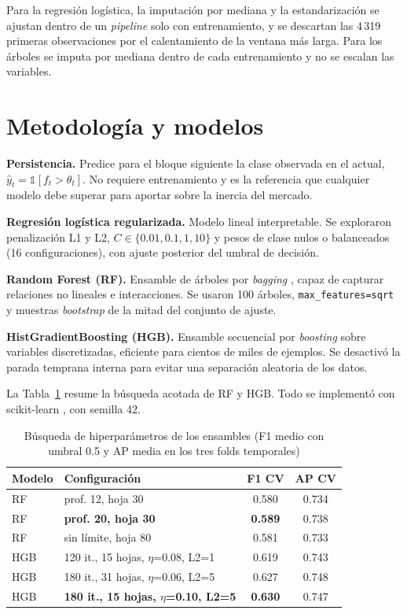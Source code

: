 \documentclass[conference]{IEEEtran}
\begin{document}
Para la regresión logística, la imputación por mediana y la estandarización se ajustan dentro de un \textit{pipeline} solo con entrenamiento, y se descartan las 4\,319 primeras observaciones por el calentamiento de la ventana más larga. Para los árboles se imputa por mediana dentro de cada entrenamiento y no se escalan las variables.

\section{Metodología y modelos}
\textbf{Persistencia.} Predice para el bloque siguiente la clase observada en el actual, $\hat y_t = \mathbb{1}[f_t > \theta_t]$. No requiere entrenamiento y es la referencia que cualquier modelo debe superar para aportar sobre la inercia del mercado.

\textbf{Regresión logística regularizada.} Modelo lineal interpretable. Se exploraron penalización L1 y L2, $C \in \{0.01, 0.1, 1, 10\}$ y pesos de clase nulos o balanceados (16 configuraciones), con ajuste posterior del umbral de decisión.

\textbf{Random Forest (RF).} Ensamble de árboles por \textit{bagging} \cite{breiman2001}, capaz de capturar relaciones no lineales e interacciones. Se usaron 100 árboles, \texttt{max\_features=sqrt} y muestras \textit{bootstrap} de la mitad del conjunto de ajuste.

\textbf{HistGradientBoosting (HGB).} Ensamble secuencial por \textit{boosting} \cite{friedman2001} sobre variables discretizadas, eficiente para cientos de miles de ejemplos. Se desactivó la parada temprana interna para evitar una separación aleatoria de los datos.

La Tabla~\ref{tab:busqueda} resume la búsqueda acotada de RF y HGB. Todo se implementó con scikit-learn \cite{sklearn}, con semilla 42.

\begin{table}[htbp]
\caption{Búsqueda de hiperparámetros de los ensambles (F1 medio con umbral 0.5 y AP media en los tres folds temporales)}
\label{tab:busqueda}
\centering
\small
\setlength{\tabcolsep}{3pt}
\begin{tabular}{llcc}
\toprule
Modelo & Configuración & F1 CV & AP CV \\
\midrule
RF & prof. 12, hoja 30 & 0.580 & 0.734 \\
RF & \textbf{prof. 20, hoja 30} & \textbf{0.589} & 0.738 \\
RF & sin límite, hoja 80 & 0.581 & 0.733 \\
HGB & 120 it., 15 hojas, $\eta$=0.08, L2=1 & 0.619 & 0.743 \\
HGB & 180 it., 31 hojas, $\eta$=0.06, L2=5 & 0.627 & 0.748 \\
HGB & \textbf{180 it., 15 hojas, $\eta$=0.10, L2=5} & \textbf{0.630} & 0.747 \\
\bottomrule
\end{tabular}
\end{table}
\end{document}

